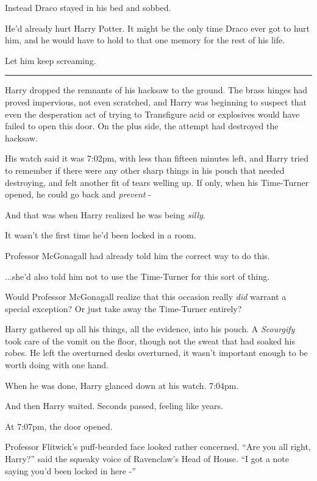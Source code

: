 Instead Draco stayed in his bed and sobbed.

He'd already hurt Harry Potter. It might be the only time Draco ever got
to hurt him, and he would have to hold to that one memory for the rest
of his life.

Let him keep screaming.

\begin{center}\rule{3in}{0.4pt}\end{center}

Harry dropped the remnants of his hacksaw to the ground. The brass
hinges had proved impervious, not even scratched, and Harry was
beginning to suspect that even the desperation act of trying to
Transfigure acid or explosives would have failed to open this door. On
the plus side, the attempt had destroyed the hacksaw.

His watch said it was 7:02pm, with less than fifteen minutes left, and
Harry tried to remember if there were any other sharp things in his
pouch that needed destroying, and felt another fit of tears welling up.
If only, when his Time-Turner opened, he could go back and
\emph{prevent} -

And that was when Harry realized he was being \emph{silly}.

It wasn't the first time he'd been locked in a room.

Professor McGonagall had already told him the correct way to do this.

...she'd also told him not to use the Time-Turner for this sort of
thing.

Would Professor McGonagall realize that this occasion really \emph{did}
warrant a special exception? Or just take away the Time-Turner entirely?

Harry gathered up all his things, all the evidence, into his pouch. A
\emph{Scourgify} took care of the vomit on the floor, though not the
sweat that had soaked his robes. He left the overturned desks
overturned, it wasn't important enough to be worth doing with one hand.

When he was done, Harry glanced down at his watch. 7:04pm.

And then Harry waited. Seconds passed, feeling like years.

At 7:07pm, the door opened.

Professor Flitwick's puff-bearded face looked rather concerned. ``Are
you all right, Harry?'' said the squeaky voice of Ravenclaw's Head of
House. ``I got a note saying you'd been locked in here -''
